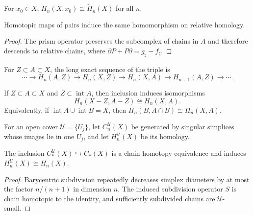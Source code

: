 \begin{example}
\label{ex:reduced-homology-relative}
For $x_0\in X$, $H_n(X,x_0)\cong\widetilde H_n(X)$ for all $n$.
\end{example}

\begin{proposition}[If two maps $f,g:(X,A)\to(Y,B)$ are homotopic through maps of pairs $(X,A)\to(Y,B)$, then $f_* = g_*:H_n(X,A)\to H_n(Y,B)$]
\label{prop:homotopic-maps-pairs}
Homotopic maps of pairs induce the same homomorphism on relative homology.
\end{proposition}
\begin{proof}
\sketch The prism operator preserves the subcomplex of chains in $A$ and therefore descends to relative chains, where $\partial P+P\partial=g_\sharp-f_\sharp$.
\end{proof}

For $Z\subset A\subset X$, the long exact sequence of the triple is
\[
\cdots\to H_n(A,Z)\to H_n(X,Z)\to H_n(X,A)\to H_{n-1}(A,Z)\to\cdots.
\]

\begin{theorem}
\label{thm:excision-general}
If $Z\subset A\subset X$ and $\overline Z\subset\operatorname{int}A$, then inclusion induces isomorphisms
\[
H_n(X-Z,A-Z)\cong H_n(X,A).
\]
Equivalently, if $\operatorname{int}A\cup\operatorname{int}B=X$, then $H_n(B,A\cap B)\cong H_n(X,A)$.
\end{theorem}

For an open cover $\mathcal U=\{U_j\}$, let $C_n^{\mathcal U}(X)$ be generated by singular simplices whose images lie in one $U_j$, and let $H_n^{\mathcal U}(X)$ be its homology.

\begin{proposition}
\label{prop:inclusion-u-chains-homotopy-equivalence}
The inclusion $C_*^{\mathcal U}(X)\hookrightarrow C_*(X)$ is a chain homotopy equivalence and induces $H_n^{\mathcal U}(X)\cong H_n(X)$.
\end{proposition}
\begin{proof}
\sketch Barycentric subdivision repeatedly decreases simplex diameters by at most the factor $n/(n+1)$ in dimension $n$.  The induced subdivision operator $S$ is chain homotopic to the identity, and sufficiently subdivided chains are $\mathcal U$-small.
\end{proof}

